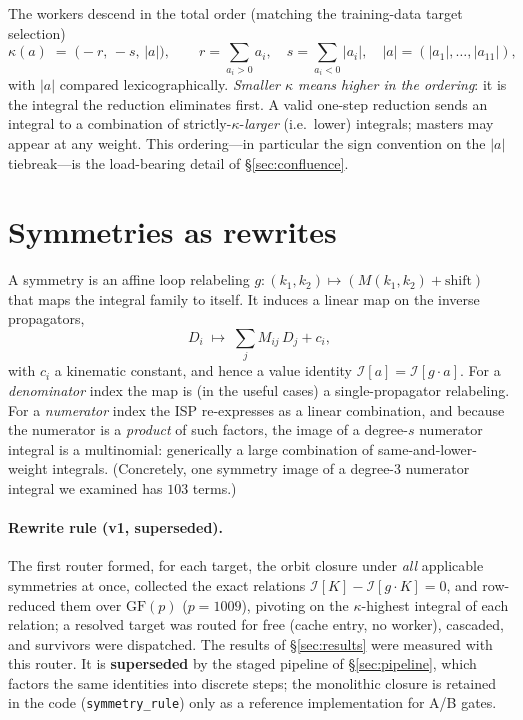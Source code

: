 \documentclass[11pt]{article}
\newcommand{\I}[1]{\mathcal{I}[#1]}
\newcommand{\kk}{\kappa}
\newcommand{\code}[1]{\texttt{#1}}
\begin{document}
The workers descend in the total order (matching the training-data target
selection)
\begin{equation}
\label{eq:kappa}
\kk(a) \;=\; \bigl(-r,\,-s,\,|a|\bigr),\qquad
r=\!\!\sum_{a_i>0}\! a_i,\quad
s=\!\!\sum_{a_i<0}\!|a_i|,\quad
|a|=(|a_1|,\dots,|a_{11}|),
\end{equation}
with $|a|$ compared lexicographically. \emph{Smaller $\kk$ means higher in the
ordering}: it is the integral the reduction eliminates first. A valid one-step
reduction sends an integral to a combination of strictly-$\kk$-\emph{larger} (i.e.\
lower) integrals; masters may appear at any weight. This ordering---in particular the
sign convention on the $|a|$ tiebreak---is the load-bearing detail of
\S\ref{sec:confluence}.

\section{Symmetries as rewrites}
A symmetry is an affine loop relabeling $g:(k_1,k_2)\mapsto (M(k_1,k_2)+\text{shift})$
that maps the integral family to itself. It induces a linear map on the inverse
propagators,
\begin{equation}
D_i \;\longmapsto\; \sum_j M_{ij}\,D_j + c_i,
\end{equation}
with $c_i$ a kinematic constant, and hence a value identity $\I{a}=\I{g\cdot a}$. For a
\emph{denominator} index the map is (in the useful cases) a single-propagator
relabeling. For a \emph{numerator} index the ISP re-expresses as a linear combination,
and because the numerator is a \emph{product} of such factors, the image of a
degree-$s$ numerator integral is a multinomial: generically a large combination of
same-and-lower-weight integrals. (Concretely, one symmetry image of a degree-3
numerator integral we examined has $103$ terms.)

\paragraph{Rewrite rule (v1, superseded).} The first router formed, for each target,
the orbit closure under \emph{all} applicable symmetries at once, collected the exact
relations $\I{K}-\I{g\cdot K}=0$, and row-reduced them over $\mathrm{GF}(p)$
($p=1009$), pivoting on the $\kk$-highest integral of each relation; a resolved target
was routed for free (cache entry, no worker), cascaded, and survivors were dispatched.
The results of \S\ref{sec:results} were measured with this router. It is
\textbf{superseded} by the staged pipeline of \S\ref{sec:pipeline}, which factors the
same identities into discrete steps; the monolithic closure is retained in the code
(\code{symmetry\_rule}) only as a reference implementation for A/B gates.
\end{document}
